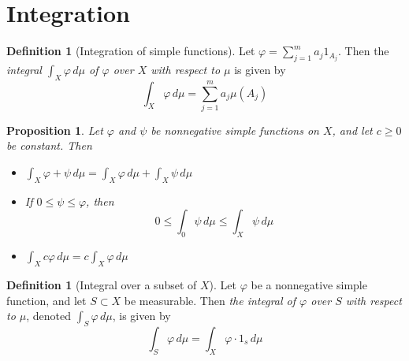 \documentclass[10pt, oneside, reqno]{amsart}
\theoremstyle{plain}%
\newtheorem{prop}[thm]{Proposition}
\theoremstyle{definition}
\newtheorem{defn}[thm]{Definition}
\theoremstyle{remark}
\newcommand{\dmu}{\, d \mu}
\renewcommand{\phi}{\varphi}
\begin{document}


























\section{Integration} %
\label{sec:integration}





\begin{defn}[Integration of simple functions]
	Let $\phi = \sum_{j=1}^m a_j 1_{A_j}$.  Then the \emph{integral $\int_X \phi \dmu$ of $\phi$ over $X$ with respect to $\mu$} is given by \[
		\int_X \phi \dmu = \sum_{j=1}^m a_j \mu (A_j)
	\]
\end{defn}

\begin{prop}
	Let $\phi$ and $\psi$ be nonnegative simple functions on $X$, and let $c \geq 0$ be constant.  Then \begin{itemize}
		\item $
			\int_X \phi  + \psi \dmu = \int_X \phi \dmu + \int_X \psi \dmu
	$
		\item If $ 0 \leq \psi \leq \phi $, then \[
			0 \leq \int_0 \psi \dmu \leq \int_X \psi \dmu
		\]
		\item $\int_X c \phi \dmu = c \int_X \phi \dmu$
	\end{itemize}
\end{prop}


\begin{defn}[Integral over a subset of $X$]
	Let $\phi$ be a nonnegative simple function, and let $S \subset X$ be measurable.  Then \emph{the integral of $\phi$ over $S$ with respect to $\mu$}, denoted $\int_S \phi \dmu$, is given by \[
		\int_S \phi \dmu = \int_X \phi \cdot 1_s \dmu
	\] 
\end{defn}
\end{document}
